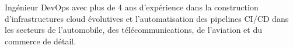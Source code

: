 \small
Ingénieur DevOps avec plus de 4 ans d'expérience dans la construction d'infrastructures cloud évolutives et l'automatisation des pipelines CI/CD dans les secteurs de l'automobile, des télécommunications, de l'aviation et du commerce de détail.
